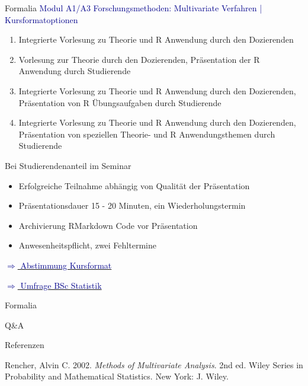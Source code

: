 \documentclass[
  8pt,
  ignorenonframetext,
]{beamer}
\providecommand{\tightlist}{%
  \setlength{\itemsep}{0pt}\setlength{\parskip}{0pt}}
\newlength{\cslhangindent}
\newlength{\cslentryspacingunit} %
\newenvironment{CSLReferences}[2] %
 {%
  \setlength{\parindent}{0pt}
  \ifodd #1
  \let\oldpar\par
  \def\par{\hangindent=\cslhangindent\oldpar}
  \fi
  \setlength{\parskip}{#2\cslentryspacingunit}
 }%
 {}
\begin{document}
\begin{frame}{Formalia}
\protect\hypertarget{formalia-3}{}
\textcolor{darkblue}{Modul A1/A3 Forschungsmethoden: Multivariate Verfahren | Kursformatoptionen}
\small

\begin{enumerate}
[(1)]
\item
  \justifying Integrierte Vorlesung zu Theorie und R Anwendung durch den
  Dozierenden
\item
  Vorlesung zur Theorie durch den Dozierenden, Präsentation der R
  Anwendung durch Studierende
\item
  Integrierte Vorlesung zu Theorie und R Anwendung durch den
  Dozierenden, Präsentation von R Übungsaufgaben durch Studierende
\item
  Integrierte Vorlesung zu Theorie und R Anwendung durch den
  Dozierenden, Präsentation von speziellen Theorie- und R
  Anwendungsthemen durch Studierende
\end{enumerate}

Bei Studierendenanteil im Seminar

\begin{itemize}
\tightlist
\item
  Erfolgreiche Teilnahme abhängig von Qualität der Präsentation
\item
  Präsentationsdauer 15 - 20 Minuten, ein Wiederholungstermin
\item
  Archivierung RMarkdown Code vor Präsentation
\item
  Anwesenheitspflicht, zwei Fehltermine
\end{itemize}

\normalsize

\href{https://elearning.ovgu.de/mod/choice/view.php?id=383582}{\textcolor{darkblue}{$\Rightarrow$ Abstimmung Kursformat}}

\href{https://elearning.ovgu.de/mod/feedback/view.php?id=383669}{\textcolor{darkblue}{$\Rightarrow$ Umfrage BSc Statistik}}
\end{frame}

\begin{frame}{Formalia}
\protect\hypertarget{formalia-4}{}
\vfill
\Huge
\center

Q\&A \vfill
\end{frame}

\begin{frame}{Referenzen}
\protect\hypertarget{referenzen}{}
\footnotesize

\hypertarget{refs}{}
\begin{CSLReferences}{1}{0}
\leavevmode{}%
Rencher, Alvin C. 2002. \emph{Methods of Multivariate Analysis}. 2nd ed.
Wiley Series in Probability and Mathematical Statistics. {New York}: {J.
Wiley}.

\end{CSLReferences}
\end{frame}
\end{document}
